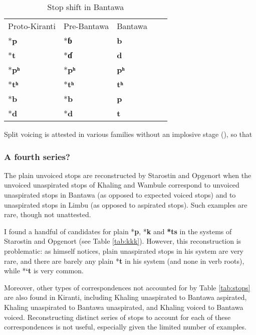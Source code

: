 \documentclass[oldfontcommands,oneside,a4paper,11pt]{article}
\newcommand{\ipa}[1]{\textbf{{\phon\mbox{#1}}}} %
\begin{document}
 

\begin{table}[H]
\caption{Stop shift in Bantawa} \centering \label{tab:bantawa}
\begin{tabular}{lllll}
Proto-Kiranti &  Pre-Bantawa &   Bantawa \\
*\ipa{p} & *\ipa{ɓ} & \ipa{b} \\
*\ipa{t} & *\ipa{ɗ} & \ipa{d} \\
*\ipa{pʰ} & *\ipa{pʰ} &  \ipa{pʰ} \\
*\ipa{tʰ} & *\ipa{tʰ} & \ipa{tʰ} \\
*\ipa{b} & *\ipa{b} &  \ipa{p} \\
*\ipa{d} & *\ipa{d} & \ipa{t} \\
\end{tabular}
\end{table}
 
 Split voicing is attested in various families without an implosive stage (\citealt[49-51]{kuemmel07wandel}), so that 

 
 

\subsubsection{A fourth series?} \label{sec:fourth}
The plain unvoiced stops are reconstructed by Starostin and Opgenort  when the unvoiced unaspirated stops of Khaling and Wambule correspond to unvoiced unaspirated stops in Bantawa (as opposed to expected voiced stops) and to unaspirated stops in Limbu (as opposed to aspirated stops). Such examples are rare, though not unattested. 

I found a handful of candidates for plain *\ipa{p}, *\ipa{k} and \ipa{*ts} in the systems of Starostin and Opgenort (see Table \ref{tab:kkk}). However, this reconstruction is problematic: as \citet[17]{opgenort05jero} himself notices, plain unaspirated stops in his system are very rare, and there are barely any plain *\ipa{t} in his system (and none in verb roots), while *\ipa{`t} is very common.  

Moreover, other types of correspondences not accounted for by Table \ref{tab:stops} are also found in Kiranti, including Khaling  unaspirated to Bantawa aspirated, Khaling unaspirated to Bantawa unaspirated, and Khaling voiced to Bantawa voiced. Reconstructing distinct series of stops to account for each of these correspondences is not useful, especially given the limited number of examples. 
\end{document}

